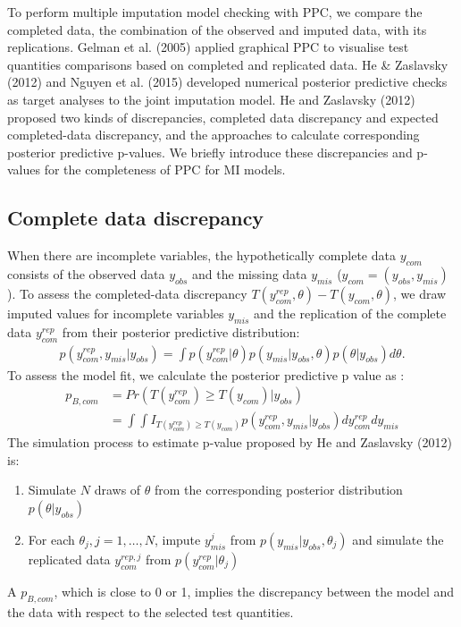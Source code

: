 \documentclass[12pt, fullpage, a4paper]{article}
\begin{document}
To perform multiple imputation model checking with PPC, we compare the completed data, the combination of the observed and imputed data, with its replications. Gelman et al. (2005) applied graphical PPC to visualise test quantities comparisons based on completed and replicated data. He \& Zaslavsky (2012) and Nguyen et al. (2015) developed numerical posterior predictive checks as target analyses to the joint imputation model. He and Zaslavsky (2012) proposed two kinds of discrepancies, completed data discrepancy and expected completed-data discrepancy, and the approaches to calculate corresponding posterior predictive p-values. We briefly introduce these discrepancies and p-values for the completeness of PPC for MI models.



\subsection{Complete data discrepancy}
When there are incomplete variables, the hypothetically complete data $y_{com}$ consists of the observed data $y_{obs}$ and the missing data $y_{mis}$ ($y_{com} = (y_{obs}, y_{mis})$). To assess the completed-data discrepancy $T(y_{com}^{rep}, \theta) - T(y_{com}, \theta)$, we draw imputed values for incomplete variables $y_{mis}$ and the replication of the complete data $y_{com}^{rep}$ from their posterior predictive distribution:
\begin{equation}
	\begin{array}{ll}
		p(y_{com}^{rep}, y_{mis}|y_{obs}) = \int p(y_{com}^{rep}|\theta)p(y_{mis}|y_{obs}, \theta)p(\theta|y_{obs})d\theta.
	\end{array} 
\end{equation}
To assess the model fit, we calculate the posterior predictive p value as :
\begin{equation}
	\begin{array}{ll}
		p_{B, com} &= Pr(T(y_{com}^{rep}) \ge T(y_{com})|y_{obs})\\
		&= \int\int I_{T(y_{com}^{rep}) \ge T(y_{com})}p(y_{com}^{rep}, y_{mis}|y_{obs})dy_{com}^{rep}dy_{mis}
	\end{array} 
\end{equation}
The simulation process to estimate p-value proposed by He and Zaslavsky (2012) is:
\begin{enumerate}
	\item Simulate $N$ draws of $\theta$ from the corresponding posterior distribution $p(\theta|y_{obs})$
	\item For each $\theta_{j}, j=1, \dots, N$, impute $y_{mis}^j$ from $p(y_{mis}|y_{obs}, \theta_{j})$ and simulate the replicated data $y_{com}^{rep, j}$ from $p(y_{com}^{rep}|\theta_{j})$
\end{enumerate}
A $p_{B, com}$, which is close to 0 or 1, implies the discrepancy between the model and the data with respect to the selected test quantities.
\end{document}
